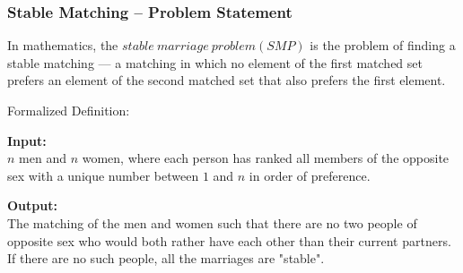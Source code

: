 \documentclass[slidestop,compress,mathserif]{beamer}
\begin{document}
\frame
{
\frametitle{Stable Matching -- Problem Statement}
In mathematics, the $stable \ marriage \ problem (SMP)$ is the problem of finding a stable matching — a matching in which no element of the first matched set prefers an element of the second matched set that also prefers the first element.
\begin{block}{Formalized Definition:}

 {\bf Input:}\\
$n$ men and $n$ women, where each person has ranked all members of the opposite sex with a unique number between $1$ and $n$ in order of preference.

 {\bf Output:}\\
The matching of the men and women such that there are no two people of opposite sex who would both rather have each other than their current partners. If there are no such people, all the marriages are "stable".



\end{block}
}
\end{document}
